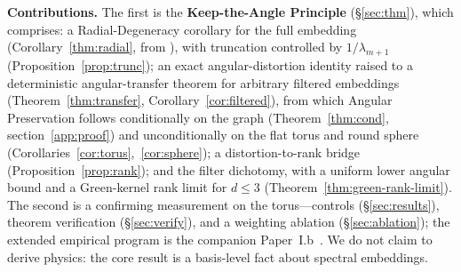 \documentclass[review]{siamart220329}
\begin{document}
\textbf{Contributions.} The first is the \textbf{Keep-the-Angle Principle}
(\S\ref{sec:thm}), which comprises: a Radial-Degeneracy corollary for the full
embedding (Corollary~\ref{thm:radial}, from \cite{vonluxburg2014}), with truncation
controlled by $1/\lambda_{m+1}$ (Proposition~\ref{prop:trunc}); an exact
angular-distortion identity raised to a deterministic angular-transfer theorem for
arbitrary filtered embeddings (Theorem~\ref{thm:transfer},
Corollary~\ref{cor:filtered}), from which Angular Preservation follows conditionally
on the graph (Theorem~\ref{thm:cond}, section~\ref{app:proof}) and unconditionally
on the flat torus and round sphere (Corollaries~\ref{cor:torus},~\ref{cor:sphere});
a distortion-to-rank bridge (Proposition~\ref{prop:rank}); and the filter dichotomy,
with a uniform lower angular bound and a Green-kernel rank limit for $d\le3$
(Theorem~\ref{thm:green-rank-limit}). The second is a confirming measurement on the
torus---controls (\S\ref{sec:results}), theorem verification (\S\ref{sec:verify}),
and a weighting ablation (\S\ref{sec:ablation}); the extended empirical program is
the companion Paper~I.b~\cite{paperIb}. We do not claim to derive physics: the core
result is a basis-level fact about spectral embeddings.
\end{document}

